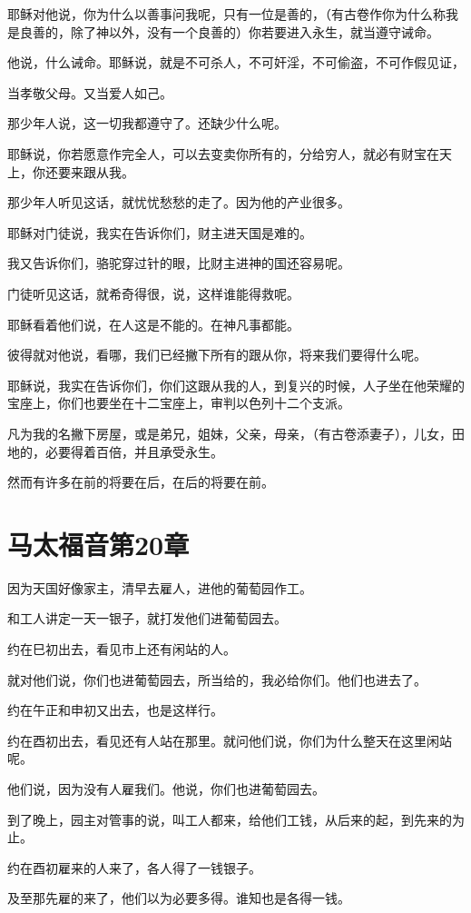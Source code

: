 \documentclass[12pt,oneside]{book}
\begin{document}
耶稣对他说，你为什么以善事问我呢，只有一位是善的，（有古卷作你为什么称我是良善的，除了神以外，没有一个良善的）你若要进入永生，就当遵守诫命。

他说，什么诫命。耶稣说，就是不可杀人，不可奸淫，不可偷盗，不可作假见证，

当孝敬父母。又当爱人如己。

那少年人说，这一切我都遵守了。还缺少什么呢。

耶稣说，你若愿意作完全人，可以去变卖你所有的，分给穷人，就必有财宝在天上，你还要来跟从我。

那少年人听见这话，就忧忧愁愁的走了。因为他的产业很多。

耶稣对门徒说，我实在告诉你们，财主进天国是难的。

我又告诉你们，骆驼穿过针的眼，比财主进神的国还容易呢。

门徒听见这话，就希奇得很，说，这样谁能得救呢。

耶稣看着他们说，在人这是不能的。在神凡事都能。

彼得就对他说，看哪，我们已经撇下所有的跟从你，将来我们要得什么呢。

耶稣说，我实在告诉你们，你们这跟从我的人，到复兴的时候，人子坐在他荣耀的宝座上，你们也要坐在十二宝座上，审判以色列十二个支派。

凡为我的名撇下房屋，或是弟兄，姐妹，父亲，母亲，（有古卷添妻子），儿女，田地的，必要得着百倍，并且承受永生。

然而有许多在前的将要在后，在后的将要在前。

\chapter{马太福音第20章}
因为天国好像家主，清早去雇人，进他的葡萄园作工。

和工人讲定一天一银子，就打发他们进葡萄园去。

约在巳初出去，看见市上还有闲站的人。

就对他们说，你们也进葡萄园去，所当给的，我必给你们。他们也进去了。

约在午正和申初又出去，也是这样行。

约在酉初出去，看见还有人站在那里。就问他们说，你们为什么整天在这里闲站呢。

他们说，因为没有人雇我们。他说，你们也进葡萄园去。

到了晚上，园主对管事的说，叫工人都来，给他们工钱，从后来的起，到先来的为止。

约在酉初雇来的人来了，各人得了一钱银子。

及至那先雇的来了，他们以为必要多得。谁知也是各得一钱。
\end{document}
